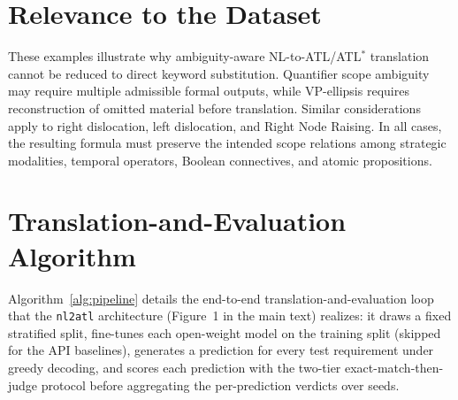 \documentclass[letterpaper]{article}
\begin{document}
\section{Relevance to the Dataset}

These examples illustrate why ambiguity-aware NL-to-ATL/ATL$^\ast$ translation cannot be reduced to direct keyword substitution. Quantifier scope ambiguity may require multiple admissible formal outputs, while VP-ellipsis requires reconstruction of omitted material before translation. Similar considerations apply to right dislocation, left dislocation, and Right Node Raising. In all cases, the resulting formula must preserve the intended scope relations among strategic modalities, temporal operators, Boolean connectives, and atomic propositions.

\section{Translation-and-Evaluation Algorithm}
\label{app:algorithm}

Algorithm~\ref{alg:pipeline} details the end-to-end translation-and-evaluation loop that the \texttt{nl2atl} architecture (Figure~1 in the main text) realizes: it draws a fixed stratified split, fine-tunes each open-weight model on the training split (skipped for the API baselines), generates a prediction for every test requirement under greedy decoding, and scores each prediction with the two-tier exact-match-then-judge protocol before aggregating the per-prediction verdicts over seeds.
\end{document}
